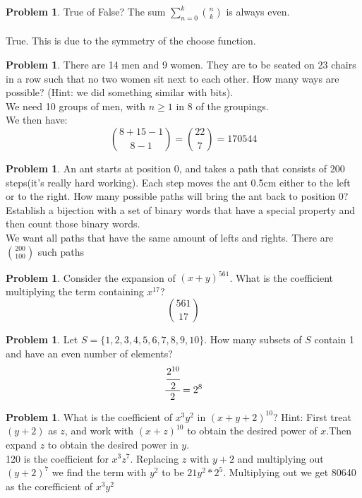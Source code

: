 \documentclass[10pt,leqno ]{article}
\theoremstyle{definition}
\newtheorem{problem}[theorem]{Problem}
\begin{document}
\begin{problem} True of False?  The sum $\sum_{n=0}^{k}{n \choose k}$ is always even.
\\\\
\Large
True.  This is due to the symmetry of the choose function.
\end{problem}
\newpage

\begin{problem} There are 14 men and 9 women.  They are to be seated on 23 chairs in a row such that no two women sit next to each other.  How many ways are possible?  (Hint:  we did something similar with bits).
\\
\Large
We need 10 groups of men, with $n \geq 1$ in 8 of the groupings.  
\\
We then have:
$${ {8 + 15 -1} \choose {8-1}} = {22 \choose 7} = 170544$$
\end{problem}
\newpage

\begin{problem} An ant starts at position 0,  and takes a path that consists of 200 steps(it’s really hard working).  Each step moves the ant 0.5cm either to the left or to the right.  How many possible paths will bring the ant back to position 0?  Establish a bijection with a set of binary words that have a special property and then count those binary words.
\\
\Large
We want all paths that have the same amount of lefts and rights.  There are ${200 \choose 100}$ such paths
\end{problem}
\newpage

\begin{problem} Consider the expansion of $(x+y)^{561}$.  What is the coefficient multiplying the term containing $x^{17}$?
\\
\Large
$${561 \choose 17}$$
\end{problem}
\newpage

\begin{problem} Let $S=\{1,2,3,4,5,6,7,8,9,10\}$.  How many subsets of $S$ contain 1 and have an even number of elements?
\\
\Large
$$\cfrac{\cfrac{2^{10}}{2}}{2} = 2^8$$
\end{problem}
\newpage

\begin{problem} What  is  the  coefficient  of $x^3 y^2$ in  $(x+y+ 2)^{10}$?  Hint:  First  treat $(y+ 2)$ as $z$, and work with $(x+z)^{10}$ to obtain the desired power of $x$.Then expand $z$ to obtain the desired power in $y$.
\\
\Large
120 is the coefficient for $x^3z^7$.  Replacing $z$ with $y+2$ and multiplying out $(y+2)^7$ we find the term with $y^2$ to be $21 y^2 * 2^5$.  Multiplying out we get 80640 as the corefficient of $x^3y^2$ 
\end{problem}
\newpage
\end{document}
